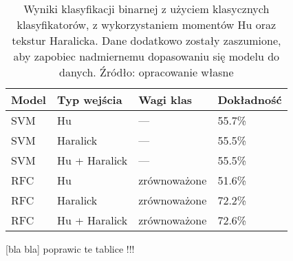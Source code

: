 \begin{table}[h]
	\centering
	\begin{threeparttable}
		\caption{Wyniki klasyfikacji binarnej z użyciem klasycznych klasyfikatorów, z wykorzystaniem momentów Hu oraz tekstur Haralicka. Dane dodatkowo zostały zaszumione, aby zapobiec nadmiernemu dopasowaniu się modelu do danych. Źródło: opracowanie własne}
		\label{svm.binary.summary.table}
		\begin{tabularx}{1\textwidth}{ |X|X|X|X| }
		  \hline
		  \textbf{Model} & \textbf{Typ wejścia} & \textbf{Wagi klas} & \textbf{Dokładność}\\

		  \hline
		  SVM & Hu & — & 55.7\%\\

		  \hline
		  SVM & Haralick & — & 55.5\%\\

		  \hline
		  SVM & Hu + Haralick & — & 55.5\%\\

		  \hline
		  RFC & Hu & zrównoważone & 51.6\%\\

		  \hline
  		  RFC & Haralick & zrównoważone & 72.2\%\\
  		  
		  \hline
  		  RFC & Hu + Haralick & zrównoważone & 72.6\%\\
  		  
		  \hline
		\end{tabularx}
	\end{threeparttable}
\end{table}
[bla bla] poprawic te tablice !!!
%
%
%
%
%
%
%


